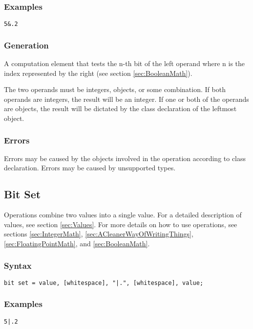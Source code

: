 \documentclass[10pt,a4paper]{article}
\begin{document}
\subsubsection{Examples}
\begin{verbatim}
5&.2
\end{verbatim}

\subsubsection{Generation}
A computation element that tests the n-th bit of the left operand where n is the index represented by the right (see section \ref{sec:BooleanMath}).

The two operands must be integers, objects, or some combination. If both operands are integers, the result will be an integer. If one or both of the operands are objects, the result will be dictated by the class declaration of the leftmost object.

\subsubsection{Errors}
Errors may be caused by the objects involved in the operation according to class declaration. Errors may be caused by unsupported types.

\newpage




\subsection{Bit Set}
Operations combine two values into a single value. For a detailed description of values, see section \ref{sec:Values}. For more details on how to use operations, see sections \ref{sec:IntegerMath}, \ref{sec:ACleanerWayOfWritingThings}, \ref{sec:FloatingPointMath}, and \ref{sec:BooleanMath}.

\subsubsection{Syntax}
\begin{verbatim}
bit set = value, [whitespace], "|.", [whitespace], value;
\end{verbatim}

\subsubsection{Examples}
\begin{verbatim}
5|.2
\end{verbatim}
\end{document}
